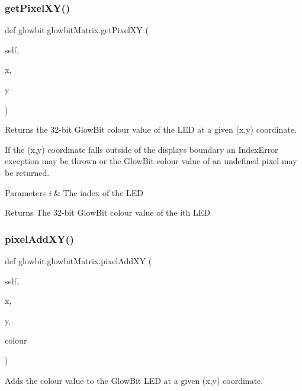 \subsubsection{\texorpdfstring{get\+Pixel\+X\+Y()}{getPixelXY()}}
{\footnotesize\ttfamily def glowbit.\+glowbit\+Matrix.\+get\+Pixel\+XY (\begin{DoxyParamCaption}\item[{}]{self,  }\item[{}]{x,  }\item[{}]{y }\end{DoxyParamCaption})}



Returns the 32-\/bit Glow\+Bit colour value of the L\+ED at a given (x,y) coordinate. 

If the (x,y) coordinate falls outside of the display\textquotesingle{}s boundary an Index\+Error exception may be thrown or the Glow\+Bit colour value of an undefined pixel may be returned.


\begin{DoxyParams}{Parameters}
{\em i} & The index of the L\+ED \\
\hline
\end{DoxyParams}
\begin{DoxyReturn}{Returns}
The 32-\/bit Glow\+Bit colour value of the i\textquotesingle{}th L\+ED 
\end{DoxyReturn}
\mbox{\label{classglowbit_1_1glowbitMatrix_ae05d008c207c5f5219e737d29185501e}} 
\subsubsection{\texorpdfstring{pixel\+Add\+X\+Y()}{pixelAddXY()}}
{\footnotesize\ttfamily def glowbit.\+glowbit\+Matrix.\+pixel\+Add\+XY (\begin{DoxyParamCaption}\item[{}]{self,  }\item[{}]{x,  }\item[{}]{y,  }\item[{}]{colour }\end{DoxyParamCaption})}



Adds the colour value to the Glow\+Bit L\+ED at a given (x,y) coordinate. 

